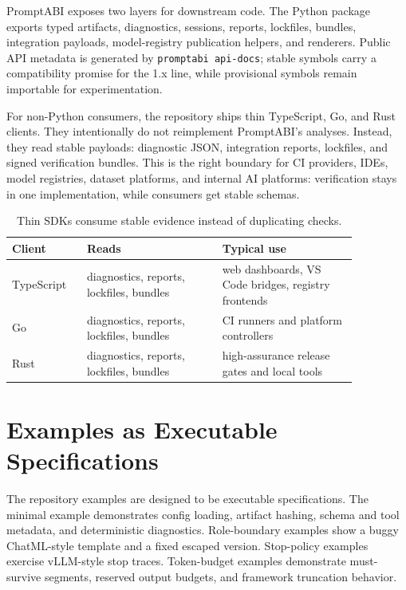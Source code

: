 \documentclass[10pt]{article}
\begin{document}
PromptABI exposes two layers for downstream code. The Python package exports
typed artifacts, diagnostics, sessions, reports, lockfiles, bundles, integration
payloads, model-registry publication helpers, and renderers. Public API metadata
is generated by \texttt{promptabi api-docs}; stable symbols carry a compatibility
promise for the 1.x line, while provisional symbols remain importable for
experimentation.

For non-Python consumers, the repository ships thin TypeScript, Go, and Rust
clients. They intentionally do not reimplement PromptABI's analyses. Instead,
they read stable payloads: diagnostic JSON, integration reports, lockfiles, and
signed verification bundles. This is the right boundary for CI providers, IDEs,
model registries, dataset platforms, and internal AI platforms: verification
stays in one implementation, while consumers get stable schemas.

\begin{table}[h]
\centering
\small
\begin{tabular}{p{0.18\linewidth}p{0.34\linewidth}p{0.34\linewidth}}
\toprule
Client & Reads & Typical use \\
\midrule
TypeScript & diagnostics, reports, lockfiles, bundles & web dashboards,
VS Code bridges, registry frontends \\
Go & diagnostics, reports, lockfiles, bundles & CI runners and platform
controllers \\
Rust & diagnostics, reports, lockfiles, bundles & high-assurance release
gates and local tools \\
\bottomrule
\end{tabular}
\caption{Thin SDKs consume stable evidence instead of duplicating checks.}
\label{tab:sdks}
\end{table}

\newpage
\section{Examples as Executable Specifications}

The repository examples are designed to be executable specifications. The
minimal example demonstrates config loading, artifact hashing, schema and tool
metadata, and deterministic diagnostics. Role-boundary examples show a buggy
ChatML-style template and a fixed escaped version. Stop-policy examples exercise
vLLM-style stop traces. Token-budget examples demonstrate must-survive segments,
reserved output budgets, and framework truncation behavior.
\end{document}
